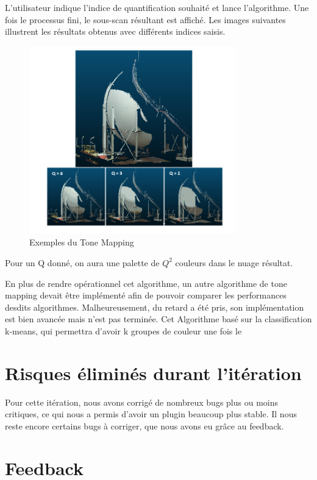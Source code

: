 \documentclass[12pt,titlepage,french]{article}
\begin{document}
L'utilisateur indique l'indice de quantification souhaité et lance l'algorithme. Une fois le processus fini, le sous-scan résultant est affiché. Les images suivantes illustrent les résultats obtenus avec différents indices saisis.
\begin{figure}[H]
 \caption{\label{} Exemples du Tone Mapping}
 \begin{center}
 \includegraphics[width=0.8\textwidth]{./img/ExpToonMapping.PNG}
  \end{center}
\end{figure}
Pour un Q donné, on aura une palette de $Q^2$ couleurs dans le nuage résultat.\newline

En plus de rendre opérationnel cet algorithme, un autre algorithme de tone mapping devait être implémenté afin de pouvoir comparer les performances desdits algorithmes. Malheureusement, du retard a été pris, son implémentation est bien avancée mais n'est pas terminée. Cet Algorithme basé sur la classification k-means, qui permettra d'avoir k groupes de couleur une fois le

\section{Risques éliminés durant l'itération}

Pour cette itération, nous avons corrigé de nombreux bugs plus ou moins critiques, ce qui nous a permis d'avoir un plugin beaucoup plus stable. Il nous reste encore certains bugs à corriger, que nous avons eu grâce au feedback.

\section{Feedback}
\end{document}
